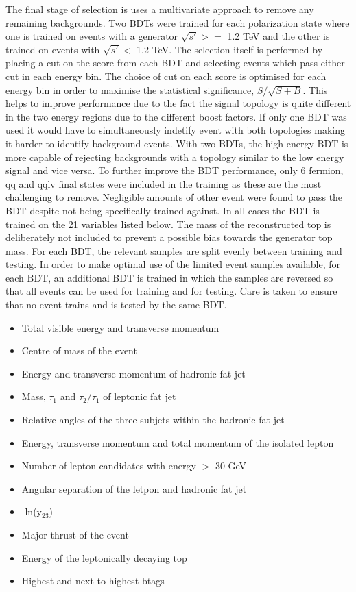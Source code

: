 The final stage of selection is uses a multivariate approach to remove any remaining backgrounds. Two \ac{BDT}s were trained for each polarization state where one is trained on events with a generator $\sqrt{s'} >=$ 1.2 TeV and the other is trained on events with  $\sqrt{s'} <$ 1.2 TeV. The selection itself is performed by placing a cut on the score from each \ac{BDT} and selecting events which pass either cut in each energy bin. The choice of cut on each score is optimised for each energy bin in order to maximise the statistical significance, $S/\sqrt{S+B}$. This helps to improve performance due to the fact the signal topology is quite different in the two energy regions due to the different boost factors. If only one \ac{BDT} was used it would have to simultaneously indetify event with both topologies making it harder to identify background events. With two \ac{BDT}s, the high energy \ac{BDT} is more capable of rejecting backgrounds with a topology similar to the low energy signal and vice versa. To further improve the \ac{BDT} performance, only 6 fermion, qq and qqlv final states were included in the training as these are the most challenging to remove.  Negligible amounts of other event were found to pass the \ac{BDT} despite not being specifically trained against. In all cases the BDT is trained on the 21 variables listed below. The mass of the reconstructed top is deliberately not included to prevent a possible bias towards the generator top mass. For each \ac{BDT}, the relevant samples are split evenly between training and testing. In order to make optimal use of the limited event samples available, for each \ac{BDT}, an additional \ac{BDT} is trained in which the samples are reversed so that all events can be used for training and for testing. Care is taken to ensure that no event trains and is tested by the same \ac{BDT}.

\begin{itemize}
\item Total visible energy and transverse momentum
\item Centre of mass of the event
\item Energy and transverse momentum of hadronic fat jet
\item Mass, $\tau_1$ and $\tau_2/\tau_1$ of leptonic fat jet
\item Relative angles of the three subjets within the hadronic fat jet
\item Energy, transverse momentum and total momentum of the isolated lepton
\item Number of lepton candidates with energy $>$ 30 GeV
\item Angular separation of the letpon and hadronic fat jet
\item -ln(y$_{23}$)
\item Major thrust of the event
\item Energy of the leptonically decaying top
\item Highest and next to highest btags
\end{itemize}

